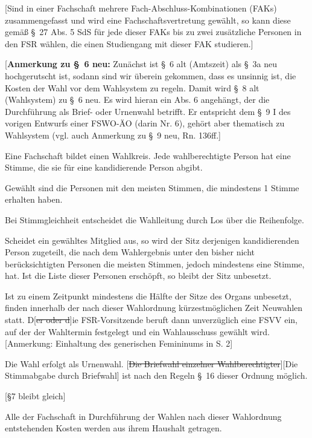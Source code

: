 \documentclass[%
draft,%
multilinesections%
]{fswo}
\newcommand\oldT[1]  {{\color{Gray}[\st{#1}]}}
\newcommand\newT[1]  {{\color{Green}[#1]}}
\newcommand\bemFr[1] {{\color{Red}[#1]}}
\newcommand\oldT[1]{}%
\newcommand\newT[1]{#1}
\newcommand\bemFr[1]{}%
\newcommand\change[2]{\oldT{#1}\newT{#2}}
\begin{document}
\begin{contract}
\newT{Sind in einer Fachschaft mehrere Fach-Abschluss-Kombinationen (FAKs) zusammengefasst und wird eine Fachschaftsvertretung gewählt, so kann diese gemäß \S~27 Abs. 5 SdS für jede dieser FAKs bis zu zwei zusätzliche Personen in den FSR wählen, die einen Studiengang mit dieser FAK studieren.}
\end{contract}

\bemFr{\textbf{Anmerkung zu \S~6 neu:} Zunächst ist \S~6 alt (Amtszeit) als \S~3a neu hochgerutscht ist, sodann sind wir überein gekommen, dass es unsinnig ist, die Kosten der Wahl vor dem Wahlsystem zu regeln. Damit wird \S~8 alt (Wahlsystem) zu \S~6 neu. Es wird hieran ein Abs. 6 angehängt, der die Durchführung als Brief- oder Urnenwahl betrifft. Er entspricht dem \S~9 I des vorigen Entwurfs einer FSWO-ÄO (darin Nr. 6), gehört aber thematisch zu Wahlsystem (vgl. auch Anmerkung zu \S~9 neu, Rn. 136ff.}

\begin{contract}
Eine Fachschaft bildet einen Wahlkreis.
Jede wahlberechtigte Person hat eine Stimme, die sie für eine kandidierende Person abgibt.

Gewählt sind die Personen mit den meisten Stimmen, die mindestens 1 Stimme erhalten haben.

Bei Stimmgleichheit entscheidet die Wahlleitung durch Los über die Reihenfolge.

Scheidet ein gewähltes Mitglied aus, so wird der Sitz derjenigen kandidierenden Person zugeteilt, die nach dem Wahlergebnis unter den bisher nicht berücksichtigten Personen die meisten Stimmen, jedoch mindestens eine Stimme, hat.
Ist die Liste dieser Personen erschöpft, so bleibt der Sitz unbesetzt.

Ist zu einem Zeitpunkt mindestens die Hälfte der Sitze des Organs unbesetzt, finden innerhalb der nach dieser Wahlordnung kürzestmöglichen Zeit Neuwahlen statt.
D\oldT{er oder d}ie FSR-Vorsitzende beruft dann unverzüglich eine FSVV ein, auf der der Wahltermin festgelegt und ein Wahlausschuss gewählt wird. \bemFr{Anmerkung: Einhaltung des generischen Femininums in S. 2}

Die Wahl erfolgt als Urnenwahl.
\change{Die Briefwahl einzelner Wahlberechtigter}{Die Stimmabgabe durch Briefwahl} ist nach den Regeln \S~16 dieser Ordnung möglich.
\end{contract}

\bemFr{\S 7 bleibt gleich}
\begin{contract}
Alle der Fachschaft in Durchführung der Wahlen nach dieser Wahlordnung entstehenden Kosten werden aus ihrem Haushalt getragen.
\end{contract}
\end{document}

